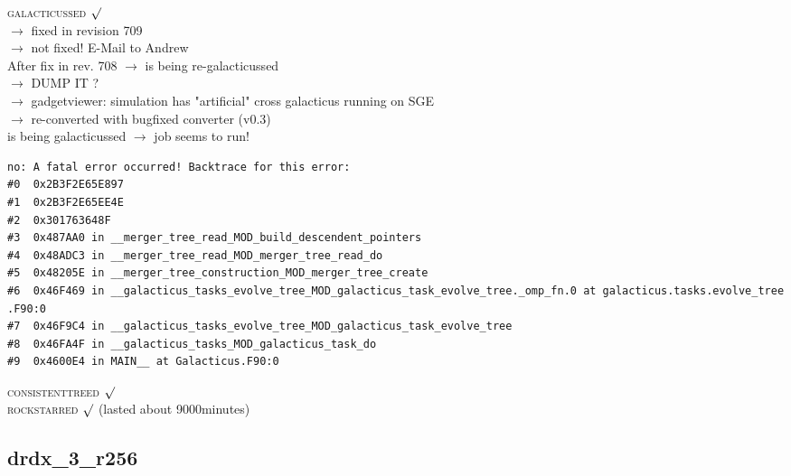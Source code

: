 \textsc{galacticussed} $\surd$ \\
$\rightarrow$ fixed in revision 709 \\
$\rightarrow$  not fixed! E-Mail to Andrew \\
After fix in rev. 708 $\rightarrow$ is being re-galacticussed \\
$\rightarrow$ DUMP IT ? \\
$\rightarrow$ gadgetviewer: simulation has "artificial" cross 
galacticus running on SGE \\
$\rightarrow$ re-converted with bugfixed converter (v0.3) \\
is being galacticussed $\rightarrow$ job seems to run! \\
\begin{verbatim}
no: A fatal error occurred! Backtrace for this error:
#0  0x2B3F2E65E897
#1  0x2B3F2E65EE4E
#2  0x301763648F
#3  0x487AA0 in __merger_tree_read_MOD_build_descendent_pointers
#4  0x48ADC3 in __merger_tree_read_MOD_merger_tree_read_do
#5  0x48205E in __merger_tree_construction_MOD_merger_tree_create
#6  0x46F469 in __galacticus_tasks_evolve_tree_MOD_galacticus_task_evolve_tree._omp_fn.0 at galacticus.tasks.evolve_tree
.F90:0
#7  0x46F9C4 in __galacticus_tasks_evolve_tree_MOD_galacticus_task_evolve_tree
#8  0x46FA4F in __galacticus_tasks_MOD_galacticus_task_do
#9  0x4600E4 in MAIN__ at Galacticus.F90:0
\end{verbatim}
\textsc{consistenttreed} $\surd$ \\ 
\textsc{rockstarred} $\surd$ (lasted about 9000minutes) \\

% 
%
%
%
%
%
%
%


\newpage
\subsection{drdx\_3\_r256}

